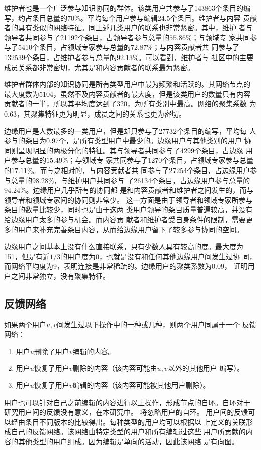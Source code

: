 维护者也是一个广泛参与知识协同的群体。该类用户共参与了143863个条目的编
写，约占条目总量的$70\%$。平均每个用户参与编辑24.5个条目。维护者与内容
贡献者的具有类似的网络特征。同上述几类用户的联系也非常紧密。其中，维护
者与领导者共同参与了21192个条目，占领导者参与总量的$55.86\%$；与领域专
家共同参与了5410个条目，占领域专家参与总量的$72.87\%$；与内容贡献者共
同参与了132539个条目，占维护者参与总量的$92.13\%$。可以看到，维护者与
社区中的主要成员关系都非常密切，尤其是和内容贡献者的联系最为紧密。

维护者群体内部的知识协同是所有类型用户中最为频繁和活跃的。其网络节点的
最大度数为5104，虽然不及内容贡献者的最大度，但是该类用户的数量只有内容
贡献者的一半，所以其平均度达到了320，为所有类别中最高。网络的聚集系数
为0.63，其聚集特征更为明显，成员之间的关系也更为密切。

边缘用户是人数最多的一类用户，但是却只参与了27732个条目的编写，平均每
人参与的条目为0.97个，是所有类型用户中最少的。边缘用户与其他类别的用户
协同则呈现明显的两极分化的特征。其与领导者共同参与了4299个条目，占边缘
用户参与总量的$15.49\%$；与领域专
家共同参与了1270个条目，占领域专家参与总量的$17.11\%$。而与之相对的，与内容贡献者共
同参与了27254个条目，占边缘用户参与总量的$98.28\%$，与维护用户共同参与
了26134个条目，占边缘用户参与总量的$94.24\%$。边缘用户几乎所有的协同都
是和内容贡献者和维护者之间发生的，而与领导者和领域专家间的协同则非常少。
这一方面是由于领导者和领域专家所参与条目的数量比较少，同时也是由于这两
类用户领导的条目质量普遍较高，并没有给边缘用户太多的参与机会。而内容贡
献者和维护者受自身条件的限制，需要更多的用户来补充完善条目内容，从而给边缘用户留下了较多参与协同的空间。

边缘用户之间基本上没有什么直接联系，只有少数人具有较高的度。最大度为
151，但是有近$1/3$的用户度为0，也就是没有和任何其他边缘用户间发生过协
同，而网络平均度为9，表明连接是非常稀疏的。边缘用户的聚类系数为0.09，
证明用户之间非常独立，没有聚集特征。

\subsection{反馈网络}
如果两个用户$u,v$间发生过以下操作中的一种或几种，则两个用户同属于一个
反馈网络：
\begin{enumerate}
\item 用户$u$删除了用户$v$编辑的内容。
\item 用户$u$恢复了用户$v$删除的内容（该内容可能由$u,v$以外的其他用户
  编写）。
\item 用户$u$恢复了用户$v$编辑的内容（该内容可能被其他用户删除）。
\end{enumerate}
用户也可以针对自己之前编辑的内容进行以上操作，形成节点的自环。自环对于
研究用户间的反馈没有意义，在本研究中。
将忽略用户的自环。
用户间的反馈可以经由条目不同版本的比较得出。每种类型的用户均可以根据以
上定义的关联形成自己的反馈网络。该网络由特定类型的用户和所有编辑过这些
用户所贡献的内容的其他类型的用户组成。因为编辑是单向的活动，因此该网络
是有向图。

